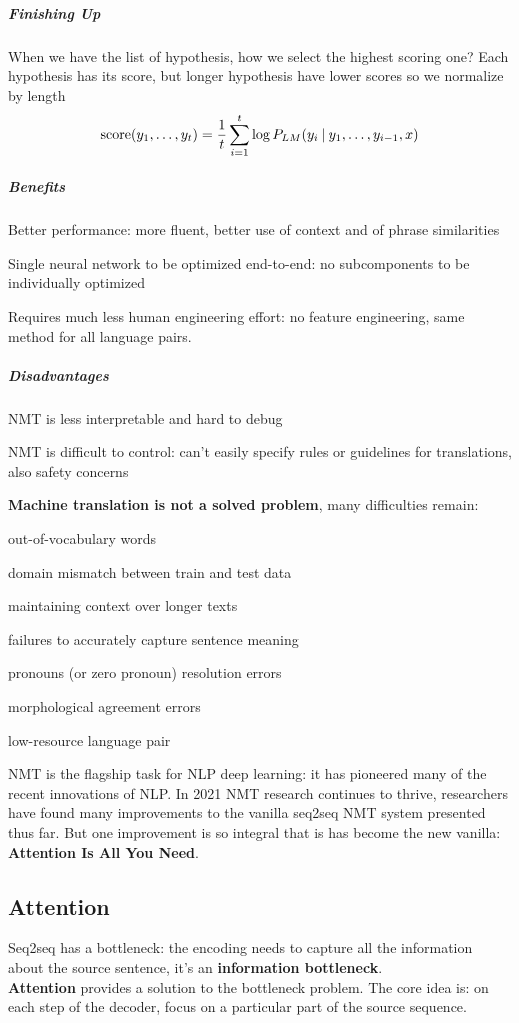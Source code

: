 \documentclass[10pt]{report}
\begin{document}
\subparagraph{Finishing Up} When we have the list of hypothesis, how we select the highest scoring one? Each hypothesis has its score, but longer hypothesis have lower scores so we normalize by length
$$\hbox{score}(y_1,\ldots,y_t) =\frac{1}{t}\sum_{i=1}^t \log P_{LM}(y_i\:|\:y_1,\ldots,y_{i-1},x)$$
\begin{multicols}{2}
\subparagraph{Benefits}\begin{list}{}{}
	\item Better performance: more fluent, better use of context and of phrase similarities
	\item Single neural network to be optimized end-to-end: no subcomponents to be individually optimized
	\item Requires much less human engineering effort: no feature engineering, same method for all language pairs.
\end{list}
\columnbreak
\subparagraph{Disadvantages}\begin{list}{}{}
	\item NMT is less interpretable and hard to debug
	\item NMT is difficult to control: can't easily specify rules or guidelines for translations, also safety concerns
\end{list}
\end{multicols}
\textbf{Machine translation is not a solved problem}, many difficulties remain:
\begin{list}{}{}
	\item out-of-vocabulary words
	\item domain mismatch between train and test data
	\item maintaining context over longer texts
	\item failures to accurately capture sentence meaning
	\item pronouns (or zero pronoun) resolution errors
	\item morphological agreement errors
	\item low-resource language pair
\end{list}
NMT is the flagship task for NLP deep learning: it has pioneered many of the recent innovations of NLP. In 2021 NMT research continues to thrive, researchers have found many improvements to the vanilla seq2seq NMT system presented thus far. But one improvement is so integral that is has become the new vanilla: \textbf{Attention Is All You Need}.
\subsection{Attention} Seq2seq has a bottleneck: the encoding needs to capture all the information about the source sentence, it's an \textbf{information bottleneck}.\\
\textbf{Attention} provides a solution to the bottleneck problem. The core idea is: on each step of the decoder, focus on a particular part of the source sequence.
\end{document}
